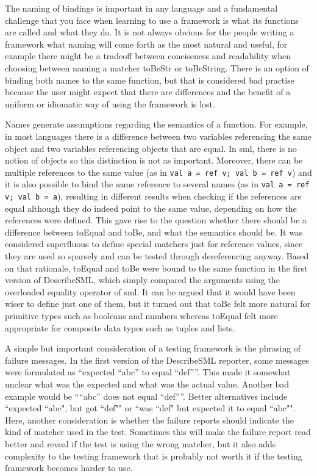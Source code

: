 \documentclass[11pt]{article}
\begin{document}
The naming of bindings is important in any language and a fundamental challenge that you face when learning to use a framework is what its functions are called and what they do. It is not always obvious for the people writing a framework what naming will come forth as the most natural and useful, for example there might be a tradeoff between conciseness and readability when choosing between naming a matcher toBeStr or toBeString. There is an option of binding both names to the same function, but that is considered bad practise because the user might expect that there are differences and the benefit of a uniform or idiomatic way of using the framework is lost.

Names generate assumptions regarding the semantics of a function. For example, in most languages there is a difference between two variables referencing the same object and two variables referencing objects that are equal. In \gls{sml}, there is no notion of objects so this distinction is not as important. Moreover, there can be multiple references to the same value (as in \texttt{val a = ref v; val b = ref v}) and it is also possible to bind the same reference to several names (as in \texttt{val a = ref v; val b = a}), resulting in different results when checking if the references are equal although they do indeed point to the same value, depending on how the references were defined. This gave rise to the question whether there should be a difference between toEqual and toBe, and what the semantics should be. It was considered superfluous to define special matchers just for reference values, since they are used so sparsely and can be tested through dereferencing anyway. Based on that rationale, toEqual and toBe were bound to the same function in the first version of DescribeSML, which simply compared the arguments using the overloaded equality operator of \gls{sml}. It can be argued that it would have been wiser to define just one of them, but it turned out that toBe felt more natural for primitive types such as booleans and numbers whereas toEqual felt more appropriate for composite data types such as tuples and lists.

A simple but important consideration of a testing framework is the phrasing of failure messages. In the first version of the DescribeSML reporter, some messages were formulated as ``expected ``abc'' to equal ``def''''. This made it somewhat unclear what was the expected and what was the actual value. Another bad example would be ````abc'' does not equal ``def''''. Better alternatives include ``expected ``abc", but got ``def"" or ``was ``def" but expected it to equal ``abc"". Here, another consideration is whether the failure reports should indicate the kind of \gls{matcher} used in the test. Sometimes this will make the failure report read better and reveal if the test is using the wrong \gls{matcher}, but it also adds complexity to the testing framework that is probably not worth it if the testing framework becomes harder to use.
\end{document}
